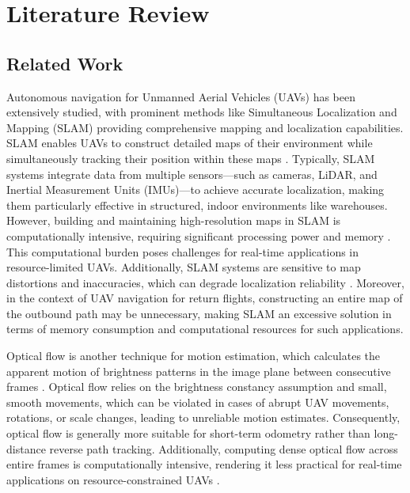 
\chapter{Literature Review}
\vspace{-1cm}



\section{Related Work}

Autonomous navigation for Unmanned Aerial Vehicles (UAVs) has been extensively studied, with prominent methods like Simultaneous Localization and Mapping (SLAM) providing comprehensive mapping and localization capabilities. SLAM enables UAVs to construct detailed maps of their environment while simultaneously tracking their position within these maps \cite{arafat2023vision}. Typically, SLAM systems integrate data from multiple sensors—such as cameras, LiDAR, and Inertial Measurement Units (IMUs)—to achieve accurate localization, making them particularly effective in structured, indoor environments like warehouses. However, building and maintaining high-resolution maps in SLAM is computationally intensive, requiring significant processing power and memory \cite{arafat2023vision}. This computational burden poses challenges for real-time applications in resource-limited UAVs. Additionally, SLAM systems are sensitive to map distortions and inaccuracies, which can degrade localization reliability \cite{arafat2023vision}. Moreover, in the context of UAV navigation for return flights, constructing an entire map of the outbound path may be unnecessary, making SLAM an excessive solution in terms of memory consumption and computational resources for such applications.

Optical flow is another technique for motion estimation, which calculates the apparent motion of brightness patterns in the image plane between consecutive frames \cite{sim2002integrated}. Optical flow relies on the brightness constancy assumption and small, smooth movements, which can be violated in cases of abrupt UAV movements, rotations, or scale changes, leading to unreliable motion estimates. Consequently, optical flow is generally more suitable for short-term odometry rather than long-distance reverse path tracking. Additionally, computing dense optical flow across entire frames is computationally intensive, rendering it less practical for real-time applications on resource-constrained UAVs \cite{barnum2003practical}.



